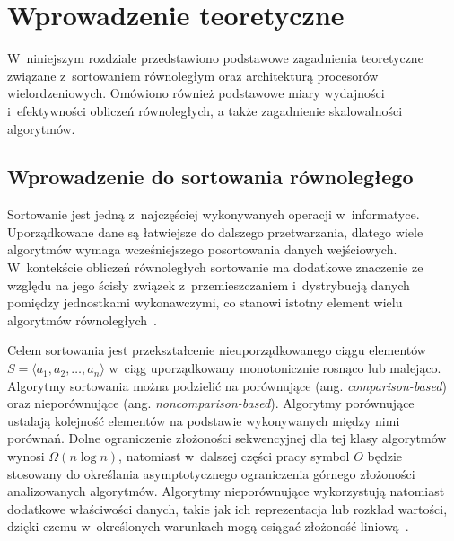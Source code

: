 \cleardoublepage
\chapter{Wprowadzenie teoretyczne}
\label{cha:RozdzialWprowadzajacy}

W~niniejszym rozdziale przedstawiono podstawowe zagadnienia teoretyczne związane z~sortowaniem 
równoległym oraz architekturą procesorów wielordzeniowych. 
Omówiono również podstawowe miary wydajności i~efektywności obliczeń równoległych, a także zagadnienie skalowalności algorytmów.


\section{Wprowadzenie do sortowania równoległego}
\label{sec:SortowanieRownolegle}

Sortowanie jest jedną z~najczęściej wykonywanych operacji w~informatyce. 
Uporządkowane dane są łatwiejsze do dalszego przetwarzania, dlatego wiele algorytmów wymaga wcześniejszego 
posortowania danych wejściowych. W~kontekście obliczeń równoległych sortowanie ma dodatkowe znaczenie ze względu 
na jego ścisły związek z~przemieszczaniem i~dystrybucją danych pomiędzy jednostkami wykonawczymi, 
co stanowi istotny element wielu algorytmów równoległych~\cite{bib:Grama}.

Celem sortowania jest przekształcenie nieuporządkowanego ciągu elementów $S = \langle a_1, a_2, \ldots, a_n \rangle$
w~ciąg uporządkowany monotonicznie rosnąco lub malejąco. Algorytmy sortowania można podzielić na porównujące
(ang. \textit{comparison-based}) oraz nieporównujące (ang. \textit{noncomparison-based}).
Algorytmy porównujące ustalają kolejność elementów na podstawie wykonywanych między nimi porównań.
Dolne ograniczenie złożoności sekwencyjnej dla tej klasy algorytmów wynosi $\Omega(n \log n)$, natomiast w~dalszej części pracy
symbol $O$ będzie stosowany do określania asymptotycznego ograniczenia górnego złożoności analizowanych algorytmów.
Algorytmy nieporównujące wykorzystują natomiast dodatkowe właściwości danych, takie jak ich reprezentacja
lub rozkład wartości, dzięki czemu w~określonych warunkach mogą osiągać złożoność liniową~\cite{bib:Grama,bib:CLRS4}.


